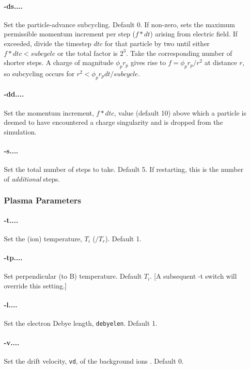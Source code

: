 \documentclass[12pt]{article}
\begin{document}
\paragraph{-ds....}
Set the particle-advance subcycling. Default 0.  If non-zero, sets the
maximum permissible momentum increment per step ($f*dt$) arising from
electric field. If exceeded, divide the timestep $dtc$ for that
particle by two until either $f*dtc<subcycle$ or the total factor is
$2^3$. Take the corresponding number of shorter steps. A charge of
magnitude $\phi_pr_p$ gives rise to $f=\phi_pr_p/r^2$ at distance $r$,
so subcycling occurs for $r^2<\phi_pr_pdt/subcycle$.

\paragraph{-dd....}
Set the momentum increment, $f*dtc$, value (default 10) above which a
particle is deemed to have encountered a charge singularity and is
dropped from the simulation.

\paragraph{-s....}
Set the total number of steps to take. Default 5. 
If restarting, this is the number of \emph{additional} steps. 

\subsubsection*{Plasma Parameters}

\paragraph{-t....}  Set the (ion) temperature, $T_i$ ($/T_r$). Default 1.

\paragraph{-tp....} Set perpendicular (to B) temperature. Default
$T_i$. [A subsequent -t switch will override this setting.]

\paragraph{-l....}  Set the electron Debye length, \verb!debyelen!. Default 1.

\paragraph{-v....}  Set the drift velocity, \verb!vd!, of the background ions . Default 0.
\end{document}
